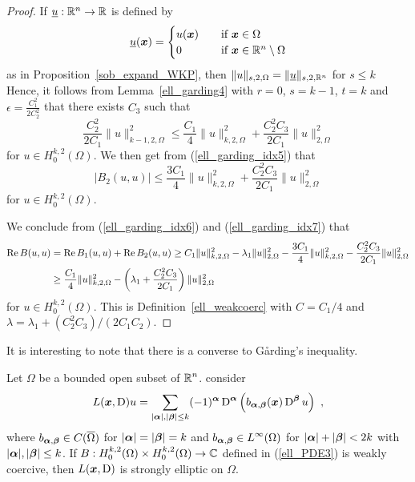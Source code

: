 \begin{proof}
If $\underline{u}:\mathbb{R}^n\rightarrow \mathbb{R}$ is defined by
\[
\underline{u}({\bm{x}}) =
\begin{cases}
u({\bm{x}}) & \quad \text{if} \ {\bm{x}} \in \Omega \\
0 & \quad \text{if} \ {\bm{x}} \in \mathbb{R}^n \setminus \Omega
\end{cases}
\]
as in Proposition~\ref{sob_expand_WKP}, then
$\|u\|_{s,2,\Omega} = \|\underline{u}\|_{s,2,\mathbb{R}^n}$ for $s\leq k$
Hence, it follows from Lemma~\ref{ell_garding4} with $r=0$, $s=k-1$, $t=k$
and $\displaystyle \epsilon = \frac{C_1^2}{2C_2^2}$ that
there exists $C_3$ such that
\[
\frac{C_2^2}{2C_1}\|u\|_{k-1,2,\Omega}^2 \leq 
\frac{C_1}{4} \|u\|_{k,2,\Omega}^2 + \frac{C_2^2 C_3}{2C_1}
\|u\|_{2,\Omega}^2
\]
for $\displaystyle u \in H^{k,2}_0(\Omega)$.  We then get from
(\ref{ell_garding_idx5}) that
\begin{equation} \label{ell_garding_idx7}
\left|B_2(u,u)\right| \leq \frac{3C_1}{4} \|u\|_{k,2,\Omega}^2
 + \frac{C_2^2C_3}{2C_1}\|u\|_{2,\Omega}^2
\end{equation}
for $\displaystyle u \in H^{k,2}_0(\Omega)$.

We conclude from (\ref{ell_garding_idx6}) and (\ref{ell_garding_idx7}) that
\begin{align*}
\operatorname{Re} B(u,u) &= \operatorname{Re} B_1(u,u) + \operatorname{Re} B_2(u,u) \geq
C_1\|u\|_{k,2,\Omega}^2 - \lambda_1 \|u\|_{2,\Omega}^2 - 
\frac{3C_1}{4} \|u\|_{k,2,\Omega}^2 - \frac{C_2^2C_3}{2C_1}\|u\|_{2,\Omega}^2 \\
&\geq \frac{C_1}{4} \|u\|_{k,2,\Omega}^2 - \left(\lambda_1 +
\frac{C_2^2C_3}{2C_1}\right) \|u\|_{2,\Omega}^2
\end{align*}
for $\displaystyle u \in H^{k,2}_0(\Omega)$.
This is Definition~\ref{ell_weakcoerc} with $C=C_1/4$ and
$\lambda = \lambda_1 + (C_2^2 C_3)/(2C_1C_2)$.
\end{proof}

It is interesting to note that there is a converse to
G\r{a}rding's inequality.

\begin{theorem}
Let $\Omega$ be a bounded open subset of $\displaystyle \mathbb{R}^n$.  consider
\[
L({\bm{x}},\operatorname{D})u = \sum_{|{\bm{\alpha}}|,|{\bm{\beta}}|\leq k}
(-1)^{{\bm{\alpha}}} \operatorname{D}^{{\bm{\alpha}}}
\left( b_{{\bm{\alpha}},{\bm{\beta}}}({\bm{x}}) \operatorname{D}^{{\bm{\beta}}} u\right) \ ,
\]
where $\displaystyle b_{{\bm{\alpha}},{\bm{\beta}}} \in C(\overline{\Omega})$ for
$|{\bm{\alpha}}|=|{\bm{\beta}}|=k$ and
$\displaystyle b_{{\bm{\alpha}},{\bm{\beta}}} \in L^\infty(\Omega)$ for
$|{\bm{\alpha}}|+|{\bm{\beta}}|<2k$ with $|{\bm{\alpha}}|,|{\bm{\beta}}|\leq k$.
If $\displaystyle B : H^{k,2}_0(\Omega) \times H^{k,2}_0(\Omega)
\rightarrow \mathbb{C}$ defined in (\ref{ell_PDE3}) is weakly coercive, then
$L({\bm{x}},\operatorname{D})$ is strongly elliptic on $\Omega$.
\end{theorem}

